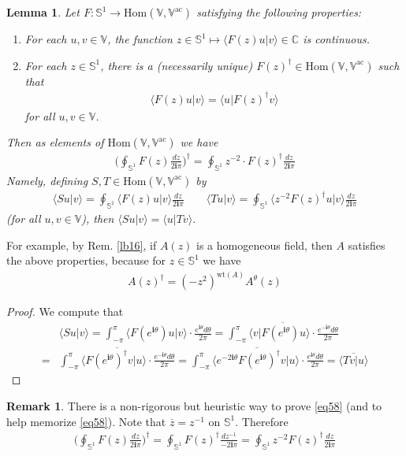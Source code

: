 \documentclass[12pt,b5paper,notitlepage]{article}
\theoremstyle{definition}
\newtheorem{rem}[df]{Remark}
\theoremstyle{plain}
\newtheorem{lm}[df]{Lemma}
\newcommand{\ovl}{\overline}
\newcommand{\Hom}{\mathrm{Hom}}
\newcommand{\bk}[1]{\langle {#1}\rangle}
\newcommand{\im}{\mathbf{i}}
\newcommand{\Vbb}{\mathbb V}
\newcommand{\Cbb}{\mathbb C}
\newcommand{\wt}{\mathrm{wt}}
\newcommand{\Sbb}{{\mathbb S}}
\newcommand{\ac}{\mathrm{ac}}
\numberwithin{equation}{section}
\begin{document}
\begin{lm}\label{lb36}
Let $F:\Sbb^1\rightarrow \Hom(\Vbb,\Vbb^\ac)$ satisfying the following properties:
\begin{enumerate}[label=(\alph*)]
\item For each $u,v\in\Vbb$, the function $z\in\Sbb^1\mapsto \bk{F(z)u|v}\in\Cbb$ is continuous.
\item For each $z\in\Sbb^1$, there is a (necessarily unique) $F(z)^\dagger\in\Hom(\Vbb,\Vbb^\ac)$ such that
\begin{align*}
\bk{F(z)u|v}=\bk{u|F(z)^\dagger v}
\end{align*}
for all $u,v\in\Vbb$.
\end{enumerate}
Then as elements of $\Hom(\Vbb,\Vbb^\ac)$ we have
\begin{align}\label{eq58}
\bigg(\oint\nolimits_{\Sbb^1}F(z)\frac{dz}{2\im\pi}\bigg)^\dagger=\oint\nolimits_{\Sbb^1}z^{-2}\cdot F(z)^\dagger \frac{dz}{2\im\pi}
\end{align}
Namely, defining $S,T\in\Hom(\Vbb,\Vbb^\ac)$ by
\begin{gather*}
\bk{Su|v}=\oint_{\Sbb^1}\nolimits\bk{F(z)u|v}\frac{dz}{2\im\pi}\qquad \bk{Tu|v}=\oint_{\Sbb^1}\nolimits\bk{z^{-2}F(z)^\dagger u|v}\frac{dz}{2\im\pi}
\end{gather*}
(for all $u,v\in\Vbb$), then $\bk{Su|v}=\bk{u|Tv}$.
\end{lm}

For example, by Rem. \ref{lb16}, if $A(z)$ is a homogeneous field, then $A$ satisfies the above properties, because for $z\in\Sbb^1$ we have
\begin{align}\label{eq61}
A(z)^\dagger=(-z^2)^{\wt(A)}A^\theta(z)
\end{align}

\begin{proof}
We compute that
\begin{align*}
&\bk{Su|v}=\int_{-\pi}^\pi \bk{F(e^{\im\theta})u|v}\cdot \frac{e^{\im\theta}d\theta}{2\pi}=\ovl{\int_{-\pi}^\pi \bk{v|F(e^{\im\theta})u}\cdot \frac{e^{-\im\theta}d\theta}{2\pi}}\\
=&\ovl{\int_{-\pi}^\pi \bk{F(e^{\im\theta})^\dagger v|u}\cdot \frac{e^{-\im\theta}d\theta}{2\pi}}=\ovl{\int_{-\pi}^\pi \bk{e^{-2\im\theta}F(e^{\im\theta})^\dagger v|u}\cdot \frac{e^{\im\theta}d\theta}{2\pi}}=\ovl{\bk{Tv|u}}
\end{align*}
\end{proof}


\begin{rem}
There is a non-rigorous but heuristic way to prove \eqref{eq58} (and to help memorize \eqref{eq58}). Note that $\ovl z=z^{-1}$ on $\Sbb^1$. Therefore
\begin{align*}
\bigg(\oint\nolimits_{\Sbb^1}F(z)\frac{dz}{2\im\pi}\bigg)^\dagger=\oint\nolimits_{\Sbb^1} F(z)^\dagger \frac{d{z^{-1}}}{-2\im\pi}=\oint\nolimits_{\Sbb^1}z^{-2} F(z)^\dagger\frac{dz}{2\im\pi}
\end{align*}
\end{rem}
\end{document}
